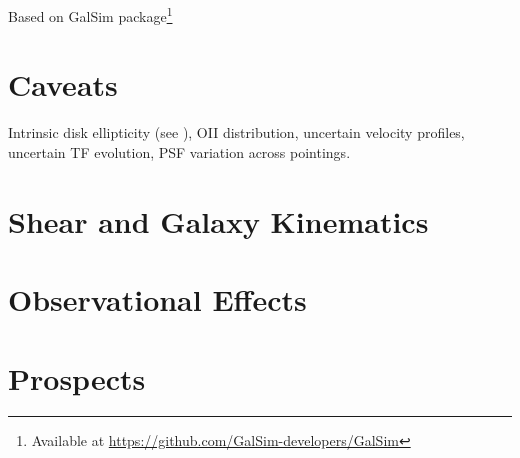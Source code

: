 Based on GalSim package\footnote{Available at \url{https://github.com/GalSim-developers/GalSim}}

\section{Caveats}

Intrinsic disk ellipticity (see \citealt{Franx1992, Franx1994}), OII
distribution, uncertain velocity profiles, uncertain TF evolution, PSF
variation across pointings.

















\section{Shear and Galaxy Kinematics}
\label{speclens_s:theory}

\section{Observational Effects}

\section{Prospects}
